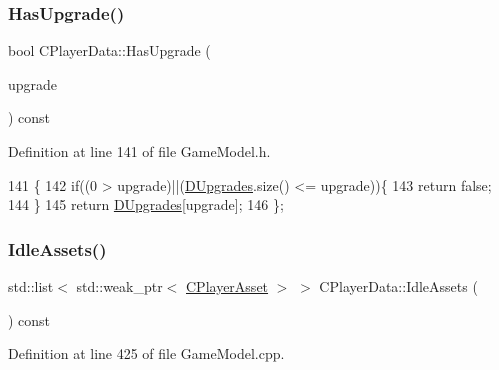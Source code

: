 \subsubsection{\texorpdfstring{Has\+Upgrade()}{HasUpgrade()}}
{\footnotesize\ttfamily bool C\+Player\+Data\+::\+Has\+Upgrade (\begin{DoxyParamCaption}\item[{\hyperlink{GameDataTypes_8h_a35b98ce26aca678b03c6f9f76e4778ce}{E\+Asset\+Capability\+Type}}]{upgrade }\end{DoxyParamCaption}) const\hspace{0.3cm}{\ttfamily [inline]}}



Definition at line 141 of file Game\+Model.\+h.


\begin{DoxyCode}
141                                                            \{
142             \textcolor{keywordflow}{if}((0 > upgrade)||(\hyperlink{classCPlayerData_ae7cb90c31ec46b65ba88485368a4b96a}{DUpgrades}.size() <= upgrade))\{
143                 \textcolor{keywordflow}{return} \textcolor{keyword}{false};   
144             \}
145             \textcolor{keywordflow}{return} \hyperlink{classCPlayerData_ae7cb90c31ec46b65ba88485368a4b96a}{DUpgrades}[upgrade];
146         \};
\end{DoxyCode}
\hypertarget{classCPlayerData_a5bd2ebe2e3dc25669bb312226e087fd1}{}\label{classCPlayerData_a5bd2ebe2e3dc25669bb312226e087fd1} 
\subsubsection{\texorpdfstring{Idle\+Assets()}{IdleAssets()}}
{\footnotesize\ttfamily std\+::list$<$ std\+::weak\+\_\+ptr$<$ \hyperlink{classCPlayerAsset}{C\+Player\+Asset} $>$ $>$ C\+Player\+Data\+::\+Idle\+Assets (\begin{DoxyParamCaption}{ }\end{DoxyParamCaption}) const}



Definition at line 425 of file Game\+Model.\+cpp.


